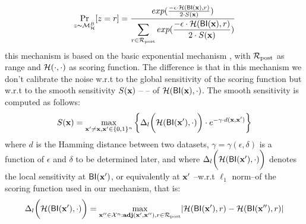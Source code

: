 \documentclass[sigconf, anonymous]{acmart}
\begin{document}
\begin{equation*}
\underset{z \thicksim \mathcal{M}^{B}_{\mathcal{H}}}{\Pr}[z=r] = \frac {exp(\frac{-\epsilon\cdot\mathcal{H}(\mathsf{BI}(\textbf{x}),r)}{2\cdot S(\textbf{x})})}
{\displaystyle\sum_{r\in\mathcal{R}_{\textup{post}}} exp(\frac{-\epsilon\cdot\mathcal{H}(\mathsf{BI}(\textbf{x}),r)}{2\cdot S(\textbf{x})})}
\end{equation*}
this mechanism is based on the basic exponential mechanism \cite{talwar}, with $\mathcal{R}_{\textup{post}}$ as range and $\mathcal{H}(\cdot,\cdot)$ as scoring function.
The difference is that in this mechanism we don't calibrate the noise w.r.t to the global sensitivity of the scoring function but w.r.t to the smooth sensitivity $S(\textbf{x})$
-- \citet{nissim2007smooth}-- of $\mathcal{H}(\mathsf{BI}(\textbf{x}), \cdot)$. The smooth sensitivity is computed as follows:
\begin{equation}
  \label{eq:smooth}
   S(\textbf{x})=\max_{\textbf{x}' \neq \textbf{x}, \textbf{x}' \in \{0,1\}^{n}}\bigg \{\Delta_{l}\bigg (\mathcal{H}(\mathsf{BI}(\textbf{x}'),\cdot)\bigg )\cdot e^{-\gamma\cdot d(\textbf{x}, \textbf{x}')}\bigg\}
\end{equation}
 where $d$ is the Hamming distance between two datasets,  $\gamma = \gamma(\epsilon, \delta)$ is a function
 of $\epsilon$ and $\delta$ to be determined later, and where $\Delta_{l}\bigg (\mathcal{H}(\mathsf{BI}(\textbf{x}'),\cdot)\bigg )$
 denotes the local sensitivity at $\mathsf{BI}(\textbf{x}')$, or equivalently at $\textbf{x}'$ --w.r.t $\ell_1$ norm--of the scoring function used in our mechanism, that is:
 \begin{equation*}
 \Delta_{l}\bigg (\mathcal{H}(\mathsf{BI}(\textbf{x}'),\cdot)\bigg )=\max_{\textbf{x}'' \in \mathcal{X}^n:\textbf{adj}(\textbf{x}',\textbf{x}''), r\in \mathcal{R}_{\textup{post}}}\lvert \mathcal{H}(\mathsf{BI}(\textbf{x}'), r) - \mathcal{H}(\mathsf{BI}(\textbf{x}''), r)\rvert
\end{equation*}
\end{document}
